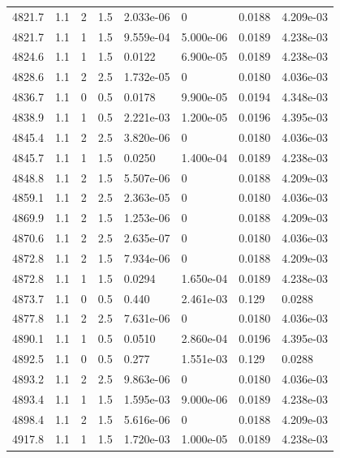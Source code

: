 \documentclass[preview]{standalone}
\begin{document}
{{{{{{{{{{{{{{{{{{{\begin{tabular}{L{1.2cm}C{1.2cm} C{0.3cm}C{0.5cm} C{1.4cm}C{1.4cm} C{1.4cm}C{1.4cm}}
  4821.7  &   1.1  & 2     & 1.5 &  2.033e-06  & 0  & 0.0188 &  4.209e-03   \\ 
  4821.7  &   1.1  & 1     & 1.5 &  9.559e-04  & 5.000e-06  & 0.0189 &  4.238e-03   \\ 
  4824.6  &   1.1  & 1     & 1.5 &  0.0122  & 6.900e-05  & 0.0189 &  4.238e-03   \\ 
  4828.6  &   1.1  & 2     & 2.5 &  1.732e-05  & 0  & 0.0180 &  4.036e-03   \\ 
  4836.7  &   1.1  & 0     & 0.5 &  0.0178  & 9.900e-05  & 0.0194 &  4.348e-03   \\ 
  4838.9  &   1.1  & 1     & 0.5 &  2.221e-03  & 1.200e-05  & 0.0196 &  4.395e-03   \\ 
  4845.4  &   1.1  & 2     & 2.5 &  3.820e-06  & 0  & 0.0180 &  4.036e-03   \\ 
  4845.7  &   1.1  & 1     & 1.5 &  0.0250  & 1.400e-04  & 0.0189 &  4.238e-03   \\ 
  4848.8  &   1.1  & 2     & 1.5 &  5.507e-06  & 0  & 0.0188 &  4.209e-03   \\ 
  4859.1  &   1.1  & 2     & 2.5 &  2.363e-05  & 0  & 0.0180 &  4.036e-03   \\ 
  4869.9  &   1.1  & 2     & 1.5 &  1.253e-06  & 0  & 0.0188 &  4.209e-03   \\ 
  4870.6  &   1.1  & 2     & 2.5 &  2.635e-07  & 0  & 0.0180 &  4.036e-03   \\ 
  4872.8  &   1.1  & 2     & 1.5 &  7.934e-06  & 0  & 0.0188 &  4.209e-03   \\ 
  4872.8  &   1.1  & 1     & 1.5 &  0.0294  & 1.650e-04  & 0.0189 &  4.238e-03   \\ 
  4873.7  &   1.1  & 0     & 0.5 &  0.440  & 2.461e-03  & 0.129 &  0.0288   \\ 
  4877.8  &   1.1  & 2     & 2.5 &  7.631e-06  & 0  & 0.0180 &  4.036e-03   \\ 
  4890.1  &   1.1  & 1     & 0.5 &  0.0510  & 2.860e-04  & 0.0196 &  4.395e-03   \\ 
  4892.5  &   1.1  & 0     & 0.5 &  0.277  & 1.551e-03  & 0.129 &  0.0288   \\ 
  4893.2  &   1.1  & 2     & 2.5 &  9.863e-06  & 0  & 0.0180 &  4.036e-03   \\ 
  4893.4  &   1.1  & 1     & 1.5 &  1.595e-03  & 9.000e-06  & 0.0189 &  4.238e-03   \\ 
  4898.4  &   1.1  & 2     & 1.5 &  5.616e-06  & 0  & 0.0188 &  4.209e-03   \\ 
  4917.8  &   1.1  & 1     & 1.5 &  1.720e-03  & 1.000e-05  & 0.0189 &  4.238e-03   \\ 

\end{tabular}}}}}}}}}}}}}}}}}}}}
\end{document}
